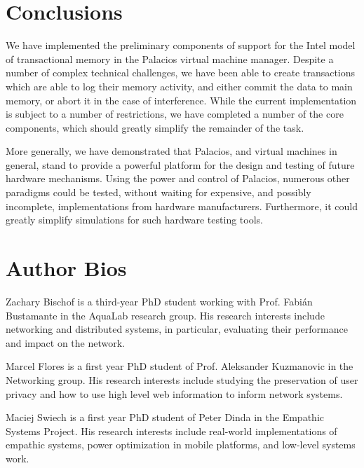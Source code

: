 \documentclass{acm_proc_article-sp}
\begin{document}
\section{Conclusions}

We have implemented the preliminary components of support for the Intel model
of transactional memory in the Palacios virtual machine manager. Despite a 
number of complex technical challenges, we have been able to create
transactions which are able to log their memory activity, and either commit
the data to main memory, or abort it in the case of interference. While the
current implementation is subject to a number of restrictions, we have 
completed a number of the core components, which should greatly simplify 
the remainder of the task.

More generally, we have demonstrated that Palacios, and virtual machines in
general, stand to provide a powerful platform for the design and testing of
future hardware mechanisms. Using the power and control of Palacios, numerous
other paradigms could be tested, without waiting for expensive, and possibly
incomplete, implementations from hardware manufacturers. Furthermore, it could
greatly simplify simulations for such hardware testing tools. 

\section{Author Bios}

Zachary Bischof is a third-year PhD student working with Prof. Fabi\'{a}n
Bustamante in the AquaLab research group. His research interests include
networking and distributed systems, in particular, evaluating their performance
and impact on the network.

Marcel Flores is a first year PhD student of Prof. Aleksander Kuzmanovic in the
Networking group. His research interests include studying the preservation of
user privacy and how to use high level web information to inform network
systems.

Maciej Swiech is a first year PhD student of Peter Dinda in the Empathic
Systems Project. His research interests include real-world implementations of
empathic systems, power optimization in mobile platforms, and low-level systems
work.


\end{document}
